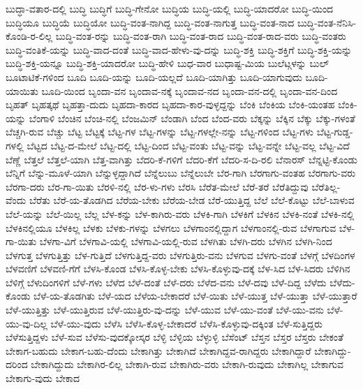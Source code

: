 {ಬುದ್ಧಾ-ವತಾರ-ದಲ್ಲಿ
ಬುದ್ಧಿ
ಬುದ್ಧಿಗೆ
ಬುದ್ಧಿ-ಗೇನೋ
ಬುದ್ಧಿಯ
ಬುದ್ಧಿ-ಯಲ್ಲಿ
ಬುದ್ಧಿ-ಯಾದರೋ
ಬುದ್ಧಿ-ಯಿಂದ
ಬುದ್ಧಿಯೂ
ಬುದ್ಧಿಯೆ
ಬುದ್ಧಿಯೋ
ಬುದ್ಧಿ-ವಂತ-ನಾಗಿದ್ದ
ಬುದ್ಧಿ-ವಂತ-ನಾಗುತ್ತ
ಬುದ್ಧಿ-ವಂತ-ನಾದ
ಬುದ್ಧಿ-ವಂತ-ನೆನಿಸಿ-ಕೊಂಡಿ-ರ-ಲಿಲ್ಲ
ಬುದ್ಧಿ-ವಂತ-ರನ್ನು
ಬುದ್ಧಿ-ವಂತ-ರಾಗಿ
ಬುದ್ಧಿ-ವಂತ-ರಾದ
ಬುದ್ಧಿ-ವಂತ-ರಾದ-ವರು
ಬುದ್ಧಿ-ವಂತರು
ಬುದ್ಧಿ-ವಂತಿಕೆ-ಯನ್ನು
ಬುದ್ಧಿ-ವಾದ-ದಂತೆ
ಬುದ್ಧಿ-ವಾದ-ಹೇಳು-ವು-ದನ್ನು
ಬುದ್ಧಿ-ಶಕ್ತಿ
ಬುದ್ಧಿ-ಶಕ್ತಿಗೆ
ಬುದ್ಧಿ-ಶಕ್ತಿ-ಯನ್ನು
ಬುದ್ಧಿ-ಶಕ್ತಿ-ಯನ್ನೂ
ಬುದ್ಧಿ-ಶಕ್ತಿ-ಯಾದರೋ
ಬುದ್ಧಿ-ಹೇಳಿ
ಬುಧ-ವಾರ
ಬುಧಾಷ್ಟ-ಮಿಯ
ಬುಲೆಟ್ಗಳನ್ನು
ಬುಲ್
ಬೂಟಾಟಿಕೆ-ಗಳಿಂದ
ಬೂದಿ
ಬೂದಿ-ಯನ್ನು
ಬೂದಿ-ಯಲ್ಲದೆ
ಬೂದಿ-ಯಾಗಿತ್ತು
ಬೂದಿ-ಯಾಗುವುದು
ಬೂದಿ-ಯಾಯಿತು
ಬೂದಿ-ಯಿಂದ
ಬೃಂದಾ-ವನ
ಬೃಂದಾವ-ನಕ್ಕೆ
ಬೃಂದಾವ-ನದ
ಬೃಂದಾ-ವನ-ದಲ್ಲಿ
ಬೃಂದಾ-ವನ-ದಿಂದ
ಬೃಹತ್
ಬೃಹತ್ಕಥೆ
ಬೃಹತ್ತಾ-ದುದು
ಬೃಹದಾ-ಕಾರದ
ಬೃಹದಾ-ಕಾರ-ವುಳ್ಳದ್ದನ್ನು
ಬೆಂಕಿ
ಬೆಂಕಿಯ
ಬೆಂಕಿ-ಯಂತಹ
ಬೆಂಕಿ-ಯನ್ನು
ಬೆಂಗಾಳಿ
ಬೆಂಚಿನ
ಬೆಂಚಿ-ನಲ್ಲಿ
ಬೆಂಜಮಿನ್
ಬೆಂಡಾಗಿ
ಬೆಂದ
ಬೆಂದ-ವರು
ಬೆಕ್ಕನ್ನು
ಬೆಕ್ಕಿನ
ಬೆಕ್ಕು
ಬೆಕ್ಕು-ಗಳಂತೆ
ಬೆಚ್ಚಗಿ-ರುವ
ಬೆಚ್ಚು
ಬೆಟ್ಟ
ಬೆಟ್ಟಕ್ಕೆ
ಬೆಟ್ಟ-ಗಳ
ಬೆಟ್ಟ-ಗಳನ್ನು
ಬೆಟ್ಟ-ಗಳಲ್ಲೇ-ನನ್ನು
ಬೆಟ್ಟ-ಗಳಿಂದ
ಬೆಟ್ಟ-ಗಳು
ಬೆಟ್ಟ-ಗುಡ್ಡ-ಗಳಲ್ಲಿ
ಬೆಟ್ಟದ
ಬೆಟ್ಟ-ದ-ಮೇಲೆ
ಬೆಟ್ಟ-ದಲ್ಲಿ
ಬೆಟ್ಟ-ದಿಂದ
ಬೆಟ್ಟ-ವಂತು
ಬೆಟ್ಟ-ವನ್ನು
ಬೆಟ್ಟ-ವನ್ನೇ
ಬೆಟ್ಟ-ವಲ್ಲ
ಬೆಟ್ಟ-ವಿದೆ
ಬೆಣ್ಣೆ
ಬೆತ್ತಲೆ
ಬೆತ್ತಲೆ-ಯಾಗಿ
ಬೆತ್ತ-ವಾಗಿತ್ತು
ಬೆದರಿ-ಕೆ-ಗಳಿಗೆ
ಬೆದರಿ-ಕೆಗೆ
ಬೆದರಿ-ಸ-ದಿ-ರಲಿ
ಬೆನಾರಸ್
ಬೆನ್ನಟ್ಟಿ-ಕೊಂಡು
ಬೆನ್ನಿಗೆ
ಬೆನ್ನು-ಮೂಳೆ-ಯಾಗಿ
ಬೆನ್ನುಳ್ಳದ್ದಾಗಿದೆ
ಬೆನ್ನೆಲುಬು
ಬೆನ್ನೆಲುಬೇ
ಬೆರ-ಗಾಗಿ
ಬೆರಗಾಗು-ವಂತಹ
ಬೆರಗಾಗು-ವರು
ಬೆರಗಾ-ದರು
ಬೆರ-ಗಾ-ಯಿತು
ಬೆರಳಿ-ನಲ್ಲಿ
ಬೆರ-ಳು-ಗಳು
ಬೆರಸಿ
ಬೆರೆತ-ಮೇಲೆ
ಬೆರೆ-ತರೆ
ಬೆರೆತಿದ್ದುವು
ಬೆರೆತಿಲ್ಲ-ವೆಂದು
ಬೆರೆತು
ಬೆರೆ-ಯ-ತೊಡಗಿದ
ಬೆರೆಯ-ಬೇಕು
ಬೆರೆಯ-ಬೇಡ
ಬೆರೆ-ಯುತ್ತಿದ್ದ
ಬೆಲೆ
ಬೆಲೆ-ಕೊಟ್ಟು
ಬೆಲೆ-ಬಾಳುವ
ಬೆಲೆ-ಯನ್ನು
ಬೆಲೆ-ಯಿಲ್ಲ
ಬೆಲ್ಲ
ಬೆಳ-ಕನ್ನು
ಬೆಳ-ಕಾಗಿರು-ವರು
ಬೆಳಕಿ-ಗಾಗಿ
ಬೆಳಕಿಗೆ
ಬೆಳಕಿನ
ಬೆಳಕಿ-ನಂತೆ
ಬೆಳಕಿ-ನಲ್ಲಿ
ಬೆಳಕಿನಲ್ಲಿಯೂ
ಬೆಳಕಿಲ್ಲ
ಬೆಳಕು
ಬೆಳಕು-ಗಳನ್ನು
ಬೆಳಗಲು
ಬೆಳಗಾಂನಲ್ಲಿದ್ದಾಗ
ಬೆಳಗಾಂನಲ್ಲಿ-ರುವ
ಬೆಳಗಾಗುವ
ಬೆಳ-ಗಾ-ಯಿತು
ಬೆಳಗಾ-ವಿಗೆ
ಬೆಳಗಾವಿ-ಯಲ್ಲಿ
ಬೆಳಗಾವಿ-ಯಲ್ಲಿ-ರುವ
ಬೆಳಗಿತು
ಬೆಳಗಿ-ದರು
ಬೆಳಗಿನ
ಬೆಳಗಿ-ನಿಂದ
ಬೆಳಗುತ್ತ
ಬೆಳಗುತ್ತಿತ್ತು
ಬೆಳ-ಗುತ್ತಿದೆ
ಬೆಳಗುತ್ತಿದ್ದ-ವರು
ಬೆಳಗುತ್ತಿರು-ವನು
ಬೆಳಗುವ
ಬೆಳಗು-ವಂತೆ
ಬೆಳಗ್ಗೆ
ಬೆಳದಿಂಗಳ
ಬೆಳವಣಿಗೆ
ಬೆಳವಣಿ-ಗೆಗೆ
ಬೆಳಸಿ-ಕೊಂಡ
ಬೆಳಸಿ-ಕೊಳ್ಳ-ಬೇಕು
ಬೆಳಸಿ-ಕೊಳ್ಳುವು-ದಕ್ಕೆ
ಬೆಳ-ಸಿದ
ಬೆಳ-ಸಿದರು
ಬೆಳಿಗಿನ
ಬೆಳಿಗ್ಗೆ
ಬೆಳುದಿಂಗಳಿಗೆ
ಬೆಳೆ-ಗಳು
ಬೆಳೆದ
ಬೆಳೆ-ದಂತೆ
ಬೆಳೆ-ದರು
ಬೆಳೆದ-ವನು
ಬೆಳೆ-ದವು
ಬೆಳೆ-ದಿದ್ದ
ಬೆಳೆದು
ಬೆಳೆದು-ಕೊಂಡು
ಬೆಳೆ-ಯ-ತೊಡಗಿತು
ಬೆಳೆ-ಯದ
ಬೆಳೆಯ-ಬೇಕಾದರೆ
ಬೆಳೆ-ಯಿತು
ಬೆಳೆ-ಯುತ್ತ
ಬೆಳೆ-ಯುತ್ತಾ
ಬೆಳೆ-ಯುತ್ತಾರೆ
ಬೆಳೆ-ಯುತ್ತಿತ್ತು
ಬೆಳೆ-ಯುತ್ತಿರುವ
ಬೆಳೆ-ಯುತ್ತಿರು-ವು-ದನ್ನು
ಬೆಳೆ-ಯುವ
ಬೆಳೆ-ಯು-ವಂತೆ
ಬೆಳೆ-ಯು-ವನು
ಬೆಳೆ-ಯು-ವು-ದಿಲ್ಲ
ಬೆಳೆ-ಯು-ವುದು
ಬೆಳೆಸಿ
ಬೆಳೆಸಿ-ಕೊಳ್ಳ-ಬೇಕಾದರೆ
ಬೆಳೆಸಿ-ಕೊಳ್ಳುವು-ದಕ್ಕಿಂತ
ಬೆಳೆ-ಸುತ್ತಿದ್ದರು
ಬೆಳೆಸುತ್ತಿದ್ದಳು
ಬೆಳೆ-ಸುವ
ಬೆಳೆಸು-ವುದಕ್ಕೋಸ್ಕರ
ಬೆಳ್ಳಿ
ಬೆಳ್ಳಿಯ
ಬೆಳ್ಳುಳ್ಳಿ
ಬೆಸೆಂಟ್
ಬೆಸ್ತನ
ಬೆಸ್ತರ
ಬೆಸ್ತರು
ಬೇಕಂತೆ
ಬೇಕಾಗ-ಬಹುದು
ಬೇಕಾಗ-ಬಹು-ದೆಂದು
ಬೇಕಾಗಿತ್ತು
ಬೇಕಾಗಿದೆ
ಬೇಕಾಗಿದ್ದವ-ರಾಗಿದ್ದರು
ಬೇಕಾಗಿದ್ದಾರೆ
ಬೇಕಾಗಿದ್ದು-ದರಿಂದ
ಬೇಕಾಗಿದ್ದುದು
ಬೇಕಾಗಿರ-ಲಿಲ್ಲ
ಬೇಕಾಗಿ-ರುವ
ಬೇಕಾಗಿರು-ವರು
ಬೇಕಾಗಿ-ರುವುದು
ಬೇಕಾಗಿಲ್ಲ
ಬೇಕಾಗುವ
ಬೇಕಾಗು-ವುದು
ಬೇಕಾದ
}
